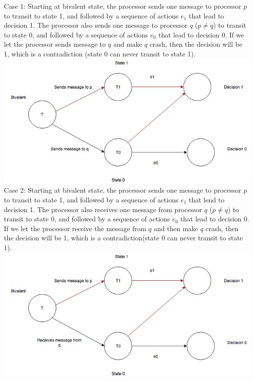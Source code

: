\documentclass{article}
\begin{document}
Case 1: Starting at bivalent state, the processor sends one message to processor $p$ to transit to state 1, and followed by a sequence of actions $e_1$ that lead to decision 1. The processor also sends one message to processor $q$ ($p\neq q$) to transit to state 0, and followed by a sequence of actions $e_0$ that lead to decision 0. If we let the processor sends message to $q$ and make $q$ crash, then the decision will be 1, which is a contradiction (state 0 can never transit to state 1).\\ \newline 
\includegraphics[width=0.9\columnwidth]{case1.jpg} \\\newline
Case 2: Starting at bivalent state, the processor sends one message to processor $p$ to transit to state 1, and followed by a sequence of actions $e_1$ that lend to decision 1. The processor also receives one message from processor $q$ ($p\neq q$) to transit to state 0, and followed by a sequence of actions $e_0$ that lead to decision 0. If we let the processor receive the message from $q$ and then make $q$ crash, then the decision will be 1, which is a contradiction(state 0 can never transit to state 1).\\ \newline
\includegraphics[width=0.9\columnwidth]{case2.jpg} \\ \newline
\end{document}
